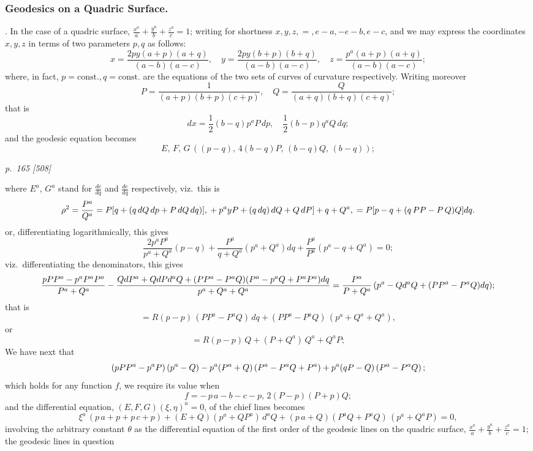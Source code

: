 \documentclass[11pt,a4paper]{book}
\begin{document}
\subsubsection*{Geodesics on a Quadric Surface.}

. In the case of a quadric surface, $\frac{x^a}{a} + \frac{y^a}{b} + \frac{z^a}{c} = 1$; writing for shortness
$x, y, z, =, e - a, -e - b, e - c$, and we may express the coordinates $x, y, z$ in terms of two
parameters $p, q$ as follows:
\[
x = \frac{2py(a + p)(a + q)}{(a - b)(a - c)},\quad y = \frac{2py(b + p)(b + q)}{(a - b)(a - c)},\quad z = \frac{p^a(a + p)(a + q)}{(a - b)(a - c)};
\]
where, in fact, $p = \mathrm{const.}, q = \mathrm{const.}$ are the equations of the two sets of curves of
curvature respectively. Writing moreover
\[
P = \frac{1}{(a + p)(b + p)(c + p)},\quad Q = \frac{Q}{(a + q)(b + q)(c + q)};
\]
that is
\[
dx = \frac{1}{2}(b - q) p^a P\,dp,\quad \frac{1}{2}(b - p) q^a Q\,dq;
\]
and the geodesic equation becomes
\[
E,\,F,\,G\,((p - q),\,4(b - q)P,\,(b - q) Q,\,(b - q));
\]

\clearpage

\bigskip
\textit{p.~165 [508]}
\smallskip

\noindent
where $E^a$, $G^a$ stand for $\frac{de}{dq}$ and $\frac{de}{dq}$ respectively, viz.\ this is
\[
\rho^2 = \frac{P^a}{Q^a} = P[q + (q\,d Q\,dp + P\,d Q\,dq)],\\
+ p^a y P + (q\,dq)\,d Q + Q\,d P]\\
+ q + Q^a,\\
= P[p - q + (q\,P P - P\,Q) Q] dq.
\]
or, differentiating logarithmically, this gives
\[
\frac{2p^aP^a}{p^a + Q^a}(p - q) + \frac{P^a}{q + Q^a}(p^a + Q^a)dq + \frac{P^a}{P^a}(p^a - q + Q^a) = 0;
\]
viz.\ differentiating the denominators, this gives
\[
\frac{p P P^a - p^a P^a P^a}{P^a + Q^a} - \frac{Q d P^a + Q d P d^a Q + (P P^a - P^a Q)(P^a - p^a Q + P^a P^a)dq}{p^a + Q^a + Q^a}\\
= \frac{P^a}{P + Q^a}\,(p^a - Q d^a Q + (P P^a - P^a Q)dq);
\]
that is
\[
= R(p - p)\,(P P^a - P^a Q)\,dq + (P P^a - P^a Q)\,(p^a + Q^a + Q^a),
\]
or
\[
= R(p - p)\,Q + (P + Q^a)\,Q^a + Q^a P;
\]
We have next that
\[
(p P P^a - p^a P)\,(p^a - Q) - p^a (P^a + Q)\,(P^a - P^a Q + P^a)\\
+ p^a (q P - Q)\,(P^a - P^a Q)\,;
\]
which holds for any function $f$, we require its value when
\[
f = -\,p\,a - b - c - p,\,2(P - p)(P + p)Q;
\]
and the differential equation, $(E, F, G)(\xi, \eta)^a = 0$, of the chief lines becomes
\[
\xi^a\,(p\,a + p + p\,c + p) + (E + Q)(p^a + Q P^a)\,d^a Q + (p\,a + Q)(P^a Q + P^a Q)\,(p^a + Q^a P) = 0,
\]
involving the arbitrary constant $\theta$ as the differential equation of the first order of
the geodesic lines on the quadric surface, $\frac{x^a}{a} + \frac{y^a}{b} + \frac{z^a}{c} = 1$; the geodesic lines in question
\end{document}
